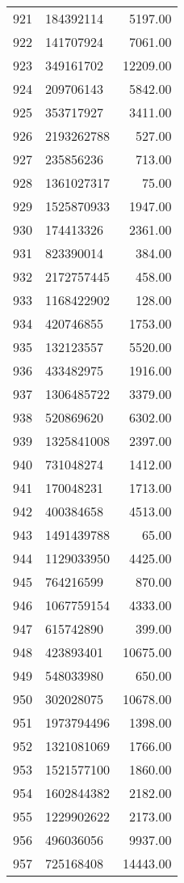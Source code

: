 \begin{table}[ht]
\begin{tabular}{rlr}
  921 & 184392114 & 5197.00 \\ 
  922 & 141707924 & 7061.00 \\ 
  923 & 349161702 & 12209.00 \\ 
  924 & 209706143 & 5842.00 \\ 
  925 & 353717927 & 3411.00 \\ 
  926 & 2193262788 & 527.00 \\ 
  927 & 235856236 & 713.00 \\ 
  928 & 1361027317 & 75.00 \\ 
  929 & 1525870933 & 1947.00 \\ 
  930 & 174413326 & 2361.00 \\ 
  931 & 823390014 & 384.00 \\ 
  932 & 2172757445 & 458.00 \\ 
  933 & 1168422902 & 128.00 \\ 
  934 & 420746855 & 1753.00 \\ 
  935 & 132123557 & 5520.00 \\ 
  936 & 433482975 & 1916.00 \\ 
  937 & 1306485722 & 3379.00 \\ 
  938 & 520869620 & 6302.00 \\ 
  939 & 1325841008 & 2397.00 \\ 
  940 & 731048274 & 1412.00 \\ 
  941 & 170048231 & 1713.00 \\ 
  942 & 400384658 & 4513.00 \\ 
  943 & 1491439788 & 65.00 \\ 
  944 & 1129033950 & 4425.00 \\ 
  945 & 764216599 & 870.00 \\ 
  946 & 1067759154 & 4333.00 \\ 
  947 & 615742890 & 399.00 \\ 
  948 & 423893401 & 10675.00 \\ 
  949 & 548033980 & 650.00 \\ 
  950 & 302028075 & 10678.00 \\ 
  951 & 1973794496 & 1398.00 \\ 
  952 & 1321081069 & 1766.00 \\ 
  953 & 1521577100 & 1860.00 \\ 
  954 & 1602844382 & 2182.00 \\ 
  955 & 1229902622 & 2173.00 \\ 
  956 & 496036056 & 9937.00 \\ 
  957 & 725168408 & 14443.00 \\ 

\end{tabular}
\end{table}
